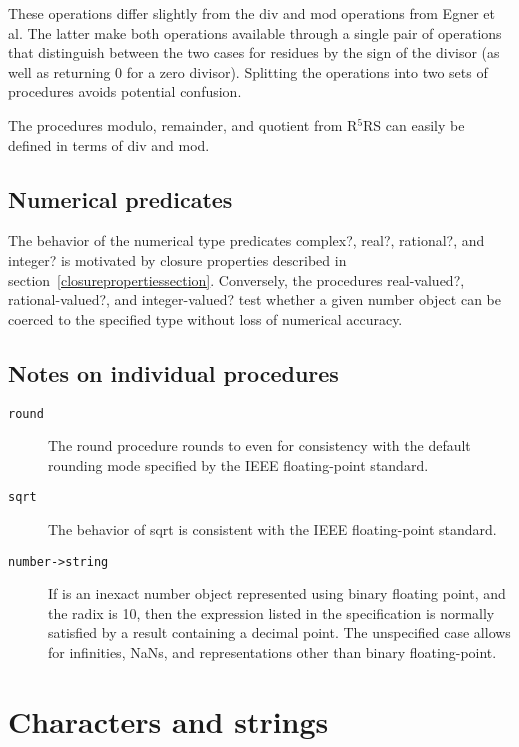 \documentclass[twoside,twocolumn]{algol60}
\newcommand{\rn}[1]{R$^{#1}$RS}
\begin{document}
These operations differ slightly from the $\mathrm{div}$ and
$\mathrm{mod}$ operations from Egner et al.  The latter make both operations
available through a single pair of operations that distinguish
between the two cases for residues by the sign of the divisor (as well
as returning $0$ for a zero divisor).  Splitting the operations into
two sets of procedures avoids potential confusion.

The procedures {\cf modulo}, {\cf remainder}, and {\cf quotient} from
\rn{5} can easily be defined in terms of {\cf div} and {\cf mod}.

\subsection{Numerical predicates}

The behavior of the numerical type predicates {\cf complex?}, {\cf
  real?}, {\cf rational?}, and {\cf integer?} is motivated by
closure properties described in
section~\ref{closurepropertiessection}.  Conversely, the procedures
{\cf real-valued?}, {\cf rational-valued?}, and {\cf integer-valued?}
test whether a given number object can be coerced to the specified type
without loss of numerical accuracy.

\subsection{Notes on individual procedures}

\begin{description}
\item[{\tt round}]
The {\cf round} procedure rounds to even for consistency with the
default rounding mode specified by the IEEE floating-point standard.
\item[{\tt sqrt}]
The behavior of {\cf sqrt} is consistent with the IEEE floating-point
standard.
\item[{\tt number->string}]
If  is an inexact number object represented using binary floating
point, and the radix is 10, then the expression listed in the
specification is normally satisfied by a result containing a decimal
point.  The unspecified case allows for infinities, NaNs, and
representations other than binary floating-point.
\end{description}

\section{Characters and strings}
\end{document}
